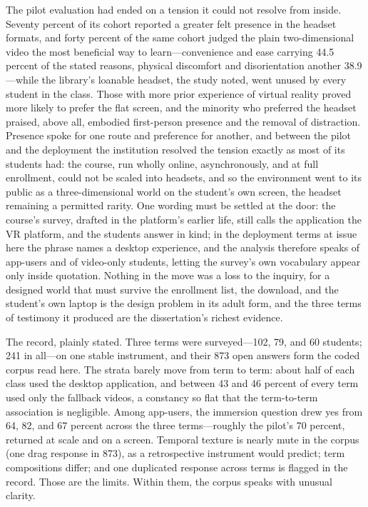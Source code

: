 \documentclass{article}
\begin{document}
The pilot evaluation had ended on a tension it could not resolve from inside. Seventy percent of its cohort reported a greater felt presence in the headset formats, and forty percent of the same cohort judged the plain two-dimensional video the most beneficial way to learn---convenience and ease carrying 44.5 percent of the stated reasons, physical discomfort and disorientation another 38.9---while the library's loanable headset, the study noted, went unused by every student in the class. Those with more prior experience of virtual reality proved more likely to prefer the flat screen, and the minority who preferred the headset praised, above all, embodied first-person presence and the removal of distraction. Presence spoke for one route and preference for another, and between the pilot and the deployment the institution resolved the tension exactly as most of its students had: the course, run wholly online, asynchronously, and at full enrollment, could not be scaled into headsets, and so the environment went to its public as a three-dimensional world on the student's own screen, the headset remaining a permitted rarity. One wording must be settled at the door: the course's survey, drafted in the platform's earlier life, still calls the application the VR platform, and the students answer in kind; in the deployment terms at issue here the phrase names a desktop experience, and the analysis therefore speaks of app-users and of video-only students, letting the survey's own vocabulary appear only inside quotation. Nothing in the move was a loss to the inquiry, for a designed world that must survive the enrollment list, the download, and the student's own laptop is the design problem in its adult form, and the three terms of testimony it produced are the dissertation's richest evidence.

The record, plainly stated. Three terms were surveyed---102, 79, and 60 students; 241 in all---on one stable instrument, and their 873 open answers form the coded corpus read here. The strata barely move from term to term: about half of each class used the desktop application, and between 43 and 46 percent of every term used only the fallback videos, a constancy so flat that the term-to-term association is negligible. Among app-users, the immersion question drew yes from 64, 82, and 67 percent across the three terms---roughly the pilot's 70 percent, returned at scale and on a screen. Temporal texture is nearly mute in the corpus (one drag response in 873), as a retrospective instrument would predict; term compositions differ; and one duplicated response across terms is flagged in the record. Those are the limits. Within them, the corpus speaks with unusual clarity.
\end{document}
